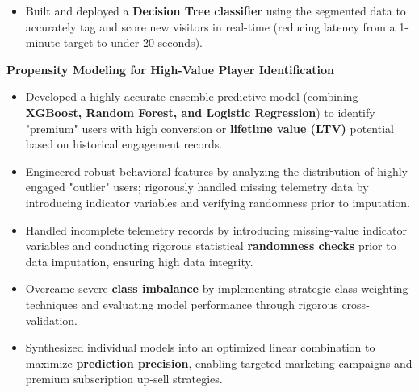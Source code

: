 \begin{cventries}
{\begin{cvitems}
\begin{itemize}
{            Developed a scalable customer segmentation model using \textbf{Principal Component Analysis (PCA)} 
            for dimensionality reduction and \textbf{K-Means clustering}, 
            successfully categorizing users into 5 distinct behavioral cohorts based on their propensity to purchase.
          }
          \item {
            Built and deployed a \textbf{Decision Tree classifier} using the segmented data to 
            accurately tag and score new visitors in real-time 
            (reducing latency from a 1-minute target to under 20 seconds).
          }
        \end{itemize}
      \vspace{0.5mm}
      \item {\textbf{Propensity Modeling for High-Value Player Identification}}
        \begin{itemize}
          \item {
            Developed a highly accurate ensemble predictive model 
            (combining \textbf{XGBoost, Random Forest, and Logistic Regression}) 
            to identify "premium" users with high conversion or \textbf{lifetime value (LTV)} potential 
            based on historical engagement records.
          }
          \item {
            Engineered robust behavioral features by analyzing the distribution of 
            highly engaged "outlier" users; 
            rigorously handled missing telemetry data by introducing indicator variables 
            and verifying randomness prior to imputation.
          }
          \item {
            Handled incomplete telemetry records by introducing missing-value indicator variables 
            and conducting rigorous statistical \textbf{randomness checks} prior to data imputation, 
            ensuring high data integrity.
          }
          \item {
            Overcame severe \textbf{class imbalance} by implementing strategic class-weighting techniques 
            and evaluating model performance through rigorous cross-validation.
          }
          \item {
            Synthesized individual models into an optimized linear combination to 
            maximize \textbf{prediction precision}, enabling targeted marketing campaigns 
            and premium subscription up-sell strategies.
          }
        \end{itemize}
      \vspace{0.5mm}

\end{cvitems}}
\end{cventries}
